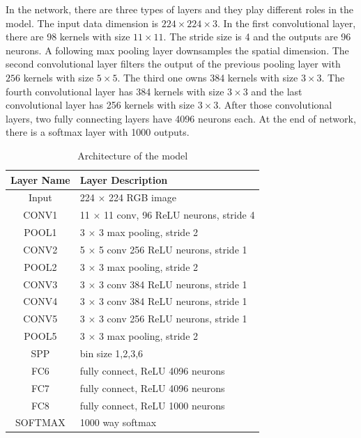 In the network, there are three types of layers and they play different roles in the model. The input data dimension is $224\times224\times3$. In the first convolutional layer, there are 98 kernels with size $11\times11$. The stride size is 4 and the outputs are 96 neurons. A following max pooling layer downsamples the spatial dimension. The second convolutional layer filters the output of the previous pooling layer with $256$ kernels with size $5\times5$. The third one owns 384 kernels with size $3\times3$. The fourth convolutional layer has 384 kernels with size $3\times3$ and the last convolutional layer has 256 kernels with size $3\times3$. After those convolutional layers, two fully connecting layers have 4096 neurons each. At the end of network, there is a softmax layer with 1000 outputs.
\begin{table}[h]
\begin{center}
    \begin{tabular}{ | c | p{8cm} | }
    \hline
    Layer Name & Layer Description \\ \hline
    Input & 224 $\times$ 224 RGB image \\ \hline
    CONV1 & 11 $\times$ 11 conv, 96 ReLU neurons, stride 4 \\ \hline
    POOL1 & 3 $\times$ 3 max pooling, stride 2 \\ \hline
    CONV2 & 5 $\times$ 5 conv 256 ReLU neurons, stride 1 \\ \hline
    POOL2 & 3 $\times$ 3 max pooling, stride 2 \\ \hline
    CONV3 & 3 $\times$ 3 conv 384 ReLU neurons, stride 1 \\ \hline
    CONV4 & 3 $\times$ 3 conv 384 ReLU neurons, stride 1 \\ \hline
    CONV5 & 3 $\times$ 3 conv 256 ReLU neurons, stride 1 \\ \hline
    POOL5 & 3 $\times$ 3 max pooling, stride 2 \\ \hline
    SPP & bin size 1,2,3,6 \\ \hline
    FC6 & fully connect, ReLU 4096 neurons\\ \hline
    FC7 & fully connect, ReLU 4096 neurons\\ \hline
    FC8 & fully connect, ReLU 1000 neurons\\ \hline
    SOFTMAX & 1000 way softmax\\ \hline
    \end{tabular}
    \caption{Architecture of the model}
    \label{fig:NetPara}
\end{center}
\end{table}

















